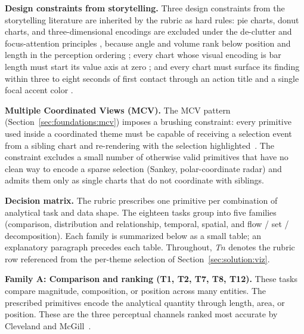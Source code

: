 \textbf{Design constraints from storytelling.}
Three design constraints from the storytelling literature are
inherited by the rubric as hard rules: pie charts, donut charts, and
three-dimensional encodings are excluded under the de-clutter and
focus-attention principles \cite{knaflic2015}, because angle and
volume rank below position and length in the perception ordering
\cite{cleveland1984}; every chart whose visual encoding is bar length
must start its value axis at zero \cite{knaflic2015}; and every chart
must surface its finding within three to eight seconds of first
contact through an action title and a single focal accent color
\cite{knaflic2015}.

\textbf{Multiple Coordinated Views (MCV).}
The MCV pattern (Section~\ref{sec:foundations:mcv}) imposes a
brushing constraint: every primitive used inside a coordinated theme
must be capable of receiving a selection event from a sibling chart
and re-rendering with the selection highlighted~\cite{liu2022}. The
constraint excludes a small number of otherwise valid primitives that
have no clean way to encode a sparse selection (Sankey,
polar-coordinate radar) and admits them only as single charts that
do not coordinate with siblings.

\noindent\textbf{Decision matrix.} The rubric prescribes one primitive per combination of analytical task
and data shape. The eighteen tasks group into five families
(comparison, distribution and relationship, temporal, spatial, and
flow / set / decomposition). Each family is summarized below as a
small table; an explanatory paragraph precedes each table. Throughout,
\emph{T$n$} denotes the rubric row referenced from the per-theme
selection of Section~\ref{sec:solution:viz}.

\textbf{Family A: Comparison and ranking (T1, T2, T7, T8, T12).}
These tasks compare magnitude, composition, or position across many
entities. The prescribed primitives encode the analytical quantity
through length, area, or position. These are the three perceptual
channels ranked most accurate by Cleveland and
McGill~\cite{cleveland1984}.

